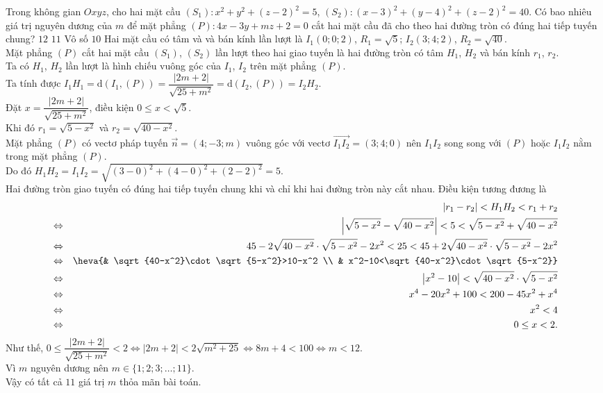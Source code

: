 \begin{ex}%
	Trong không gian $Oxyz$, cho hai mặt cầu $(S_1)\colon x^2+y^2+(z-2)^2=5$, $(S_2)\colon (x-3)^2+(y-4)^2+(z-2)^2=40$. Có bao nhiêu giá trị nguyên dương của $m$ để mặt phẳng $(P)\colon 4x-3y+mz+2=0$ cắt hai mặt cầu đã cho theo hai đường tròn có đúng hai tiếp tuyến chung?
	\choice
	{$12$}
	{\True $11$}
	{Vô số}
	{$10$}
	\loigiai
	{Hai mặt cầu có tâm và và bán kính lần lượt là $I_1(0;0;2)$, $R_1=\sqrt{5}$; $I_2(3;4;2)$, $R_2=\sqrt{40}$.\\
	Mặt phẳng $(P)$ cắt hai mặt cầu $(S_1)$, $(S_2)$ lần lượt theo hai giao tuyến là hai đường tròn có tâm $H_1$, $H_2$ và bán kính $r_1$, $r_2$.\\
	Ta có $H_1$, $H_2$ lần lượt là hình chiếu vuông góc của $I_1$, $I_2$ trên mặt phẳng $(P)$.\\
	Ta tính được $I_1H_1=\mathrm{d}\left(I_1,(P)\right)=\dfrac{|2m+2|}{\sqrt{25+m^2}}=\mathrm{d}\left(I_2,(P)\right)=I_2H_2$.\\
	Đặt $x=\dfrac{|2m+2|}{\sqrt{25+m^2}}$, điều kiện $0\leq x<\sqrt{5}$.\\
	Khi đó $r_1=\sqrt{5-x^2}$ và $r_2=\sqrt{40-x^2}$.\\
	Mặt phẳng $(P)$ có vectơ pháp tuyến $\overrightarrow{n}=(4;-3;m)$ vuông góc với vectơ $\overrightarrow{I_1 I_2}=(3;4;0)$ nên $I_1I_2$ song song với $(P)$ hoặc $I_1I_2$ nằm trong mặt phẳng $(P)$.\\
	Do đó $H_1H_2=I_1I_2=\sqrt{(3-0)^2+(4-0)^2+(2-2)^2}=5$.\\
	Hai đường tròn giao tuyến có đúng hai tiếp tuyến chung khi và chỉ khi hai đường tròn này cắt nhau. Điều kiện tương đương là \allowdisplaybreaks\begin{eqnarray*}
	&&\left|r_1-r_2\right|<H_1H_2<r_1+r_2\\
	&\Leftrightarrow & \left|\sqrt{5-x^2}-\sqrt{40-x^2}\right|<5<\sqrt{5-x^2}+\sqrt{40-x^2}\\
	&\Leftrightarrow & 45-2\sqrt{40-x^2}\cdot\sqrt{5-x^2}-2x^2<25<45+2\sqrt{40-x^2}\cdot\sqrt{5-x^2}-2x^2\\
	&\Leftrightarrow &\heva{& \sqrt{40-x^2}\cdot\sqrt{5-x^2}>10-x^2 \\ & x^2-10<\sqrt{40-x^2}\cdot\sqrt{5-x^2}}\\
	&\Leftrightarrow & \left|x^2-10\right|<\sqrt{40-x^2}\cdot\sqrt{5-x^2}\\
	&\Leftrightarrow & x^4-20x^2+100<200-45x^2+x^4\\
	&\Leftrightarrow & x^2<4\\
	&\Leftrightarrow & 0\leq x<2.
	\end{eqnarray*}
	Như thế, $0\leq \dfrac{|2m+2|}{\sqrt{25+m^2}}<2\Leftrightarrow |2m+2|<2\sqrt{m^2+25}\Leftrightarrow 8m+4<100\Leftrightarrow m<12$.\\
	Vì $m$ nguyên dương nên $m\in\{1;2;3;\ldots;11\}$.\\
	Vậy có tất cả $11$ giá trị $m$ thỏa mãn bài toán.
	}
\end{ex}

